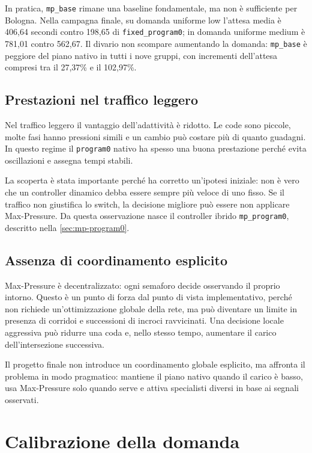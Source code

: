\documentclass[12pt,a4paper,oneside]{report}
\numberwithin{equation}{chapter}
\begin{document}
In pratica, \texttt{mp\_base} rimane una baseline fondamentale, ma non è
sufficiente per Bologna. Nella campagna finale, su domanda uniforme low
l'attesa media è 406,64 secondi contro 198,65 di
\texttt{fixed\_program0}; in domanda uniforme medium è 781,01 contro 562,67. Il
divario non scompare aumentando la domanda: \texttt{mp\_base} è peggiore del
piano nativo in tutti i nove gruppi, con incrementi dell'attesa compresi tra il
27,37\% e il 102,97\%.

\subsection{Prestazioni nel traffico leggero}

Nel traffico leggero il vantaggio dell'adattività è ridotto. Le code sono
piccole, molte fasi hanno pressioni simili e un cambio può costare più di
quanto guadagni. In questo regime il \texttt{program0} nativo ha spesso una
buona prestazione perché evita oscillazioni e assegna tempi stabili.

La scoperta è stata importante perché ha corretto un'ipotesi iniziale: non è
vero che un controller dinamico debba essere sempre più veloce di uno fisso.
Se il traffico non giustifica lo switch, la decisione migliore può essere
non applicare Max-Pressure. Da questa osservazione nasce il controller ibrido
\texttt{mp\_program0}, descritto nella \cref{sec:mp-program0}.

\subsection{Assenza di coordinamento esplicito}

Max-Pressure è decentralizzato: ogni semaforo decide osservando il proprio
intorno. Questo è un punto di forza dal punto di vista implementativo, perché
non richiede un'ottimizzazione globale della rete, ma può diventare un limite
in presenza di corridoi e successioni di incroci ravvicinati. Una decisione
locale aggressiva può ridurre una coda e, nello stesso tempo, aumentare il
carico dell'intersezione successiva.

Il progetto finale non introduce un coordinamento globale esplicito, ma affronta
il problema in modo pragmatico: mantiene il piano nativo quando il carico è
basso, usa Max-Pressure solo quando serve e attiva specialisti diversi in base
ai segnali osservati.

\section{Calibrazione della domanda}
\end{document}
